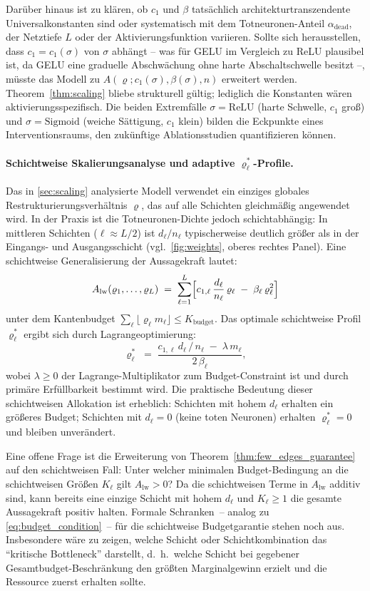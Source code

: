 \documentclass[12pt, a4paper, openany]{report}
\begin{document}
Darüber hinaus ist zu klären, ob $c_1$ und $\beta$ tatsächlich
architekturtranszendente Universalkonstanten sind oder systematisch mit dem
Totneuronen-Anteil $\alpha_{\mathrm{dead}}$, der Netztiefe $L$ oder der
Aktivierungsfunktion variieren.  Sollte sich herausstellen, dass
$c_1 = c_1(\sigma)$ von $\sigma$ abhängt -- was für GELU im Vergleich zu
ReLU plausibel ist, da GELU eine graduelle Abschwächung ohne harte
Abschaltschwelle besitzt --, müsste das Modell zu
$A(\varrho; c_1(\sigma), \beta(\sigma), n)$ erweitert werden.
Theorem~\ref{thm:scaling} bliebe strukturell gültig; lediglich die
Konstanten wären aktivierungsspezifisch.  Die beiden Extremfälle
$\sigma = \mathrm{ReLU}$ (harte Schwelle, $c_1$ groß) und
$\sigma = \mathrm{Sigmoid}$ (weiche Sättigung, $c_1$ klein) bilden die
Eckpunkte eines Interventionsraums, den zukünftige Ablationsstudien
quantifizieren können.

\paragraph{Schichtweise Skalierungsanalyse und adaptive $\varrho^*_\ell$-Profile.}
Das in \cref{sec:scaling} analysierte Modell verwendet ein einziges globales
Restrukturierungsverhältnis $\varrho$, das auf alle Schichten gleichmäßig
angewendet wird.  In der Praxis ist die Totneuronen-Dichte jedoch
schichtabhängig: In mittleren Schichten ($\ell \approx L/2$) ist
$d_\ell / n_\ell$ typischerweise deutlich größer als in der Eingangs- und
Ausgangsschicht (vgl.\ \cref{fig:weights}, oberes rechtes Panel).  Eine
schichtweise Generalisierung der Aussagekraft lautet:
\[
  A_{\mathrm{lw}}(\varrho_1, \ldots, \varrho_L)
  \;=\; \sum_{\ell=1}^{L}
  \Bigl[
    c_{1,\ell} \,\frac{d_\ell}{n_\ell}\, \varrho_\ell
    \;-\; \beta_\ell \,\varrho_\ell^2
  \Bigr]
\]
unter dem Kantenbudget $\sum_\ell \lfloor \varrho_\ell m_\ell \rfloor \leq K_{\mathrm{budget}}$.
Das optimale schichtweise Profil $\varrho^*_\ell$ ergibt sich durch Lagrange\-optimierung:
\[
  \varrho^*_\ell
  \;=\; \frac{c_{1,\ell}\,d_\ell\,/\,n_\ell \;-\; \lambda\,m_\ell}{2\,\beta_\ell},
\]
wobei $\lambda \geq 0$ der Lagrange-Multiplikator zum Budget-Constraint ist
und durch primäre Erfüllbarkeit bestimmt wird.  Die praktische Bedeutung
dieser schichtweisen Allokation ist erheblich: Schichten mit hohem $d_\ell$
erhalten ein größeres Budget; Schichten mit $d_\ell = 0$ (keine toten
Neuronen) erhalten $\varrho^*_\ell = 0$ und bleiben unverändert.

Eine offene Frage ist die Erweiterung von Theorem~\ref{thm:few_edges_guarantee}
auf den schichtweisen Fall: Unter welcher minimalen Budget-Bedingung an die
schichtweisen Größen $K_\ell$ gilt $A_{\mathrm{lw}} > 0$?  Da die
schichtweisen Terme in $A_{\mathrm{lw}}$ additiv sind, kann bereits eine
einzige Schicht mit hohem $d_\ell$ und $K_\ell \geq 1$ die gesamte
Aussagekraft positiv halten.  Formale Schranken~-- analog zu
\eqref{eq:budget_condition}~-- für die schichtweise Budgetgarantie stehen
noch aus.  Insbesondere wäre zu zeigen, welche Schicht oder Schichtkombination
das ``kritische Bottleneck'' darstellt, d.~h.\ welche Schicht bei gegebener
Gesamtbudget-Beschränkung den größten Marginalgewinn erzielt und die
Ressource zuerst erhalten sollte.
\end{document}
